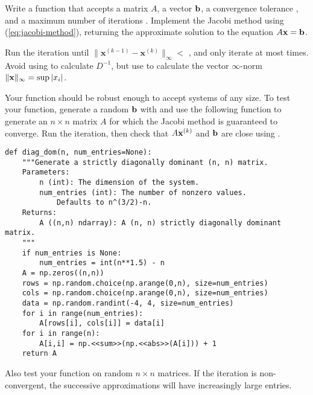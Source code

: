 \begin{problem} %
Write a function that accepts a matrix $A$, a vector $\mathbf{b}$, a convergence tolerance , and a maximum number of iterations .
Implement the Jacobi method using (\ref{eq:jacobi-method}), returning the approximate solution to the equation $A\mathbf{x} = \mathbf{b}$.

Run the iteration until $\|\mathbf{x}^{(k-1)} - \mathbf{x}^{(k)}\|_{\infty} <$ , and only iterate at most  times.
Avoid using  to calculate $D^{-1}$, but use  to calculate the vector $\infty$-norm $\|\mathbf{x}\|_\infty = \sup{|x_i|}$.

%

Your function should be robust enough to accept systems of any size.
To test your function, generate a random $\mathbf{b}$ with  and use the following function to generate an $n\times n$ matrix $A$ for which the Jacobi method is guaranteed to converge.
Run the iteration, then check that $A\mathbf{x}^{(k)}$ and $\mathbf{b}$ are close using .

\begin{lstlisting}
def diag_dom(n, num_entries=None):
    """Generate a strictly diagonally dominant (n, n) matrix.
    Parameters:
        n (int): The dimension of the system.
        num_entries (int): The number of nonzero values.
            Defaults to n^(3/2)-n.
    Returns:
        A ((n,n) ndarray): A (n, n) strictly diagonally dominant matrix.
    """
    if num_entries is None:
        num_entries = int(n**1.5) - n
    A = np.zeros((n,n))
    rows = np.random.choice(np.arange(0,n), size=num_entries)
    cols = np.random.choice(np.arange(0,n), size=num_entries)
    data = np.random.randint(-4, 4, size=num_entries)
    for i in range(num_entries):
        A[rows[i], cols[i]] = data[i]
    for i in range(n):
        A[i,i] = np.<<sum>>(np.<<abs>>(A[i])) + 1
    return A
\end{lstlisting}

Also test your function on random $n \times n$ matrices.
If the iteration is non-convergent, the successive approximations will have increasingly large entries.

\label{prob:jacobi}
\end{problem}

